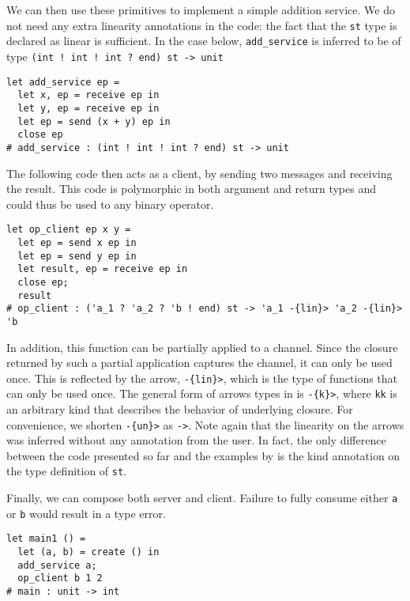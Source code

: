 
We can then use these primitives to implement a simple addition service.
We do not need any extra linearity annotations in the code: the fact
that the \texttt{st} type is declared as linear is sufficient.
In the case below, \lstinline{add_service} is inferred to be of type
\lstinline{(int ! int ! int ? end) st -> unit}

\begin{lstlisting}
let add_service ep =
  let x, ep = receive ep in
  let y, ep = receive ep in
  let ep = send (x + y) ep in
  close ep
# add_service : (int ! int ! int ? end) st -> unit
\end{lstlisting}

The following code then acts as a client, by sending two messages
and receiving the result.
This code is polymorphic in both argument and return types and could thus
be used to any binary operator.
%
\begin{lstlisting}
let op_client ep x y =
  let ep = send x ep in
  let ep = send y ep in
  let result, ep = receive ep in
  close ep;
  result
# op_client : ('a_1 ? 'a_2 ? 'b ! end) st -> 'a_1 -{lin}> 'a_2 -{lin}> 'b
\end{lstlisting}

In addition, this function can be partially
applied to a channel. Since the closure returned by such a partial
application captures the channel, it can only be used once.
This is reflected by the arrow, \lstinline/-{lin}>/, which is the
type of functions that can only be used once.
The general form of arrows types in \lang is \lstinline/-{k}>/, where
\lstinline/kk/ is an arbitrary kind that describes the behavior of
underlying closure.
For convenience, we shorten \lstinline/-{un}>/ as \lstinline/->/.
Note again that the linearity on the arrows was inferred without
any annotation from the user. In fact, the only difference between the code
presented so far and the examples by
\citet{DBLP:journals/jfp/Padovani17}
is the kind annotation on the type definition of \lstinline/st/.


Finally, we can compose both server and client.
Failure to fully consume either \lstinline/a/ or \lstinline/b/
would result in a type error.
\begin{lstlisting}
let main1 () =
  let (a, b) = create () in
  add_service a;
  op_client b 1 2
# main : unit -> int
\end{lstlisting}


